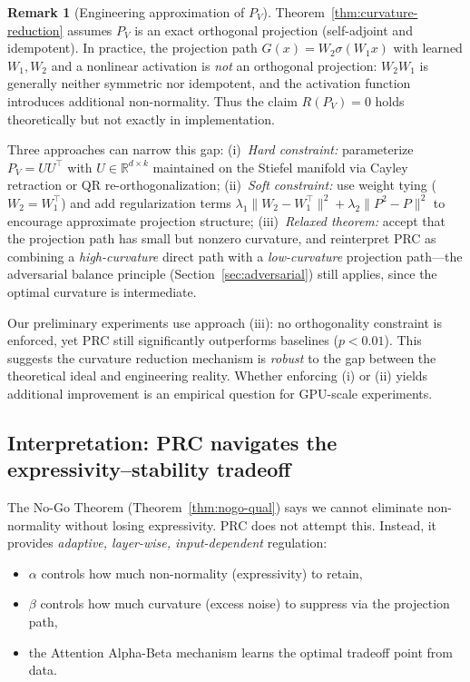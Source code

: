 \documentclass[11pt,a4paper]{article}
\theoremstyle{definition}
\newtheorem{remark}[theorem]{Remark}
\begin{document}
\begin{remark}[Engineering approximation of $P_V$]
\label{rem:pv-engineering}
Theorem~\ref{thm:curvature-reduction} assumes $P_V$ is an exact
orthogonal projection (self-adjoint and idempotent). In practice,
the projection path $G(x) = W_2 \sigma(W_1 x)$ with learned
$W_1, W_2$ and a nonlinear activation is \emph{not} an orthogonal
projection: $W_2 W_1$ is generally neither symmetric nor idempotent,
and the activation function introduces additional non-normality.
Thus the claim $R(P_V) = 0$ holds theoretically but not exactly
in implementation.

Three approaches can narrow this gap:
(i)~\emph{Hard constraint:} parameterize $P_V = UU^\top$ with
$U \in \mathbb{R}^{d \times k}$ maintained on the Stiefel manifold
via Cayley retraction or QR re-orthogonalization;
(ii)~\emph{Soft constraint:} use weight tying ($W_2 = W_1^\top$)
and add regularization terms
$\lambda_1 \|W_2 - W_1^\top\|^2 + \lambda_2 \|P^2 - P\|^2$
to encourage approximate projection structure;
(iii)~\emph{Relaxed theorem:} accept that the projection path has
small but nonzero curvature, and reinterpret PRC as combining a
\emph{high-curvature} direct path with a \emph{low-curvature}
projection path---the adversarial balance principle
(Section~\ref{sec:adversarial}) still applies, since the
optimal curvature is intermediate.

Our preliminary experiments use approach (iii): no orthogonality
constraint is enforced, yet PRC still significantly outperforms
baselines ($p < 0.01$). This suggests the curvature reduction
mechanism is \emph{robust} to the gap between the theoretical
ideal and engineering reality. Whether enforcing (i) or (ii)
yields additional improvement is an empirical question for
GPU-scale experiments.
\end{remark}

\subsection{Interpretation: PRC navigates the expressivity--stability tradeoff}

The No-Go Theorem (Theorem~\ref{thm:nogo-qual}) says we cannot eliminate
non-normality without losing expressivity. PRC does not attempt this.
Instead, it provides \emph{adaptive, layer-wise, input-dependent} regulation:
\begin{itemize}[nosep]
  \item $\alpha$ controls how much non-normality (expressivity) to retain,
  \item $\beta$ controls how much curvature (excess noise) to suppress via
        the projection path,
  \item the Attention Alpha-Beta mechanism learns the optimal tradeoff
        point from data.
\end{itemize}
\end{document}
